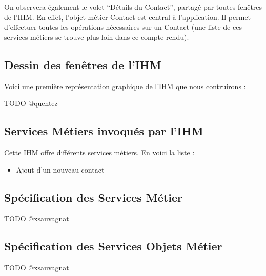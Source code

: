 On observera également le volet ``Détails du Contact'', partagé par toutes fenêtres de l'IHM.
En effet, l'objet métier Contact est central à l'application. Il permet d'effectuer toutes les
opérations nécessaires sur un Contact (une liste de ces services métiers se trouve plus loin
dans ce compte rendu).

\subsection{Dessin des fenêtres de l'IHM}

Voici une première représentation graphique de l'IHM que nous contruirons :

TODO @quentez

\subsection{Services Métiers invoqués par l'IHM}

Cette IHM offre différents services métiers. En voici la liste :

\begin{itemize}
\item Ajout d'un nouveau contact
\end{itemize}

\subsection{Spécification des Services Métier}

TODO @xsauvagnat

\subsection{Spécification des Services Objets Métier}

TODO @xsauvagnat